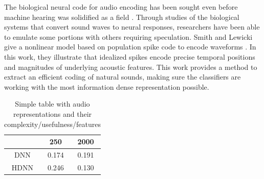 The biological neural code for audio encoding has been sought even before
machine hearing was solidified as a field \cite{Eggermont2001}. Through studies
of the biological systems that convert sound waves to neural responses,
researchers have been able to emulate some portions with others requiring
speculation. Smith and Lewicki give a nonlinear model based on population spike
code to encode waveforms \cite{smith-efficient-2006}. In this work, they
illustrate that idealized spikes encode precise temporal positions and
magnitudes of underlying acoustic features. This work provides a method to
extract an efficient coding of natural sounds, making sure the classifiers are
working with the most information dense representation possible.

\begin{table}[t]
    \centering
    \begin{tabular}{ccc}
         & 250   & 2000  \\ \hline
    DNN  & 0.174 & 0.191 \\
    HDNN & 0.246 & 0.130
    \end{tabular}
    \caption{Simple table with audio representations and their complexity/usefulness/features}
    \label{tab:audioreps}
\end{table}
